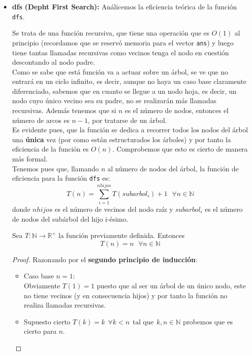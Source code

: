 \documentclass{article}
\begin{document}
\begin{itemize}
    \item \textbf{dfs (Depht First Search):}
    Análicemos la eficiencia teórica de la función \verb|dfs|.
    
    Se trata de una función recursiva, que tiene una operación que es $O(1)$ al principio (recordamos que se reservó memoria para el vector \verb|ans|) y luego tiene tantas llamadas recursivas como vecinos tenga el nodo en cuestión descontando al nodo padre.\\
    Como se sabe que está función va a actuar sobre un árbol, se ve que no entrará en un ciclo infinito, es decir, aunque no haya un caso base claramente diferenciado, sabemos que en cuanto se llegue a un nodo hoja, es decir, un nodo cuyo único vecino sea su padre, no se realizarán más llamadas recursivas. Además tenemos que si $n$ es el número de nodos, entonces el número de arcos es $n-1$, por tratarse de un árbol.\\
    Es evidente pues, que la función se dedica a recorrer todos los nodos del árbol una \textbf{única} vez (por como están estructurados los árboles) y por tanto la eficiencia de la función es $O(n)$.
    \newline
    Comprobemos que esto es cierto de manera más formal.\\
    Tenemos pues que, llamando $n$ al número de nodos del árbol, la función de eficiencia para la función \verb|dfs| es:
    $$
    T(n) = \sum^{nhijos}_{i=1} T(subarbol_i) + 1 \:\:\: \forall n \in \mathbb{N}
    $$
    donde $nhijos$ es el número de vecinos del nodo raíz y $subarbol_i$ es el número de nodos del subárbol del hijo i-ésimo.
    \newline
    \begin{teo}
    Sea $T : \mathbb{N} \longrightarrow \mathbb{R}^{+}$ la función previamente definida. Entonces $$T(n) = n \:\:\: \forall n \in \mathbb{N}$$
    \begin{proof}
        Razonando por el \textbf{segundo principio de inducción}:
        \begin{itemize}
            \item Caso base $n = 1$:\\
            Obviamente $T(1) = 1$ puesto que al ser un árbol de un único nodo, este no tiene vecinos (y en consecuencia hijos) y por tanto la función no realiza llamadas recursivas.
            \item Supuesto cierto $T(k) = k \:\: \forall k < n \:\: \text{tal que} \:\: k,n \in \mathbb{N}$ probemos que es cierto para $n$.\\

\end{itemize}
\end{proof}
\end{teo}
\end{itemize}
\end{document}
